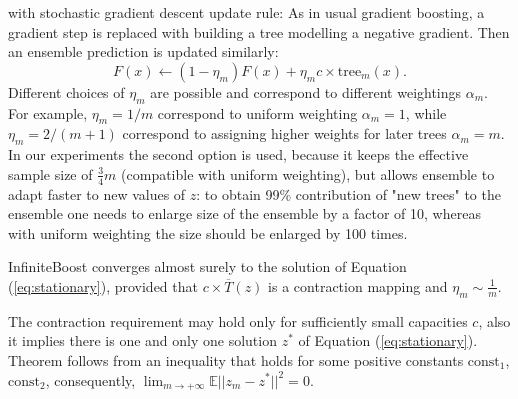 with stochastic gradient descent update rule:
As in usual gradient boosting, a gradient step is replaced with building a tree modelling a negative gradient.
Then an ensemble prediction is updated similarly:
\begin{equation*}
    F(x) \leftarrow (1 - \eta_m) F(x) + \eta_m c \times \text{tree}_m(x).
\end{equation*}
Different choices of $\eta_m$ are possible and correspond to different weightings $\alpha_m$.
For example, $\eta_m = 1 / m$ correspond to uniform weighting $\alpha_m = 1$,
while $\eta_m = 2 / (m + 1)$ correspond to assigning higher weights for later trees $\alpha_m = m$.
In our experiments the second option is used, because it keeps the effective sample size of $\frac{3}{4}m$ (compatible with uniform weighting),
but allows ensemble to adapt faster to new values of $z$:
to obtain 99\% contribution of "new trees" to the ensemble one needs to enlarge size of the ensemble by a factor of 10,
whereas with uniform weighting the size should be enlarged by 100 times.



\begin{theorem}
InfiniteBoost converges almost surely to the solution of Equation (\ref{eq:stationary}),
provided that $c \times \overline{T}(z)$ is a contraction mapping and
$\eta_m \sim \frac{1}{m}$.
\end{theorem}

The contraction requirement may hold only for sufficiently small capacities $c$,
also it implies there is one and only one solution $z^{*}$ of Equation (\ref{eq:stationary}).
Theorem follows from an inequality
that holds for some positive constants $\text{const}_1$, $\text{const}_2$,
consequently, $\lim_{m \to +\infty} \mathbb{E} || z_{m} - z^{*} ||^2 = 0$.



